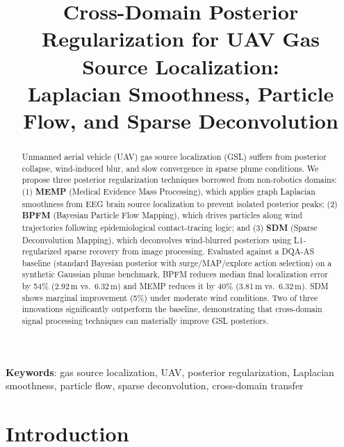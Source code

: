 \documentclass[conference]{IEEEtran}
\title{Cross-Domain Posterior Regularization for UAV Gas Source Localization:\\Laplacian Smoothness, Particle Flow, and Sparse Deconvolution}
\author{
\IEEEauthorblockN{Anonymous Authors}
\IEEEauthorblockA{Under Review}
}
\begin{document}
\maketitle

\begin{abstract}
Unmanned aerial vehicle (UAV) gas source localization (GSL) suffers from posterior collapse, wind-induced blur, and slow convergence in sparse plume conditions.
We propose three posterior regularization techniques borrowed from non-robotics domains: (1) \textbf{MEMP} (Medical Evidence Mass Processing), which applies graph Laplacian smoothness from EEG brain source localization to prevent isolated posterior peaks; (2) \textbf{BPFM} (Bayesian Particle Flow Mapping), which drives particles along wind trajectories following epidemiological contact-tracing logic; and (3) \textbf{SDM} (Sparse Deconvolution Mapping), which deconvolves wind-blurred posteriors using L1-regularized sparse recovery from image processing.
Evaluated against a DQA-AS baseline (standard Bayesian posterior with surge/MAP/explore action selection) on a synthetic Gaussian plume benchmark, BPFM reduces median final localization error by 54\% (2.92\,m vs.\ 6.32\,m) and MEMP reduces it by 40\% (3.81\,m vs.\ 6.32\,m).
SDM shows marginal improvement (5\%) under moderate wind conditions.
Two of three innovations significantly outperform the baseline, demonstrating that cross-domain signal processing techniques can materially improve GSL posteriors.
\end{abstract}

\textbf{Keywords}: gas source localization, UAV, posterior regularization, Laplacian smoothness, particle flow, sparse deconvolution, cross-domain transfer

\section{Introduction}
\end{document}
